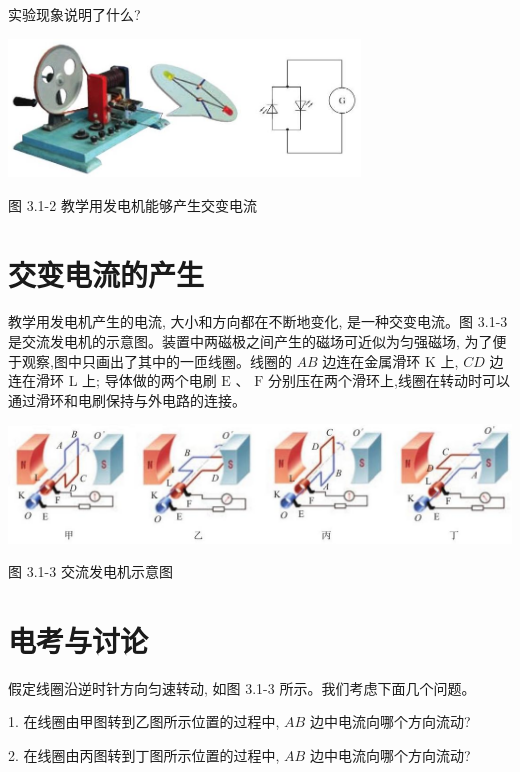 \documentclass[10pt]{article}
\begin{document}
实验现象说明了什么?

\begin{center}
\includegraphics[max width=0.7\textwidth]{images/01910e72-c5b7-7ed5-a6d4-fb3a5faefc32_55_591380.jpg}
\end{center}

图 3.1-2 教学用发电机能够产生交变电流

\section*{交变电流的产生}

教学用发电机产生的电流, 大小和方向都在不断地变化, 是一种交变电流。图 3.1-3 是交流发电机的示意图。装置中两磁极之间产生的磁场可近似为匀强磁场, 为了便于观察,图中只画出了其中的一匝线圈。线圈的 \({AB}\) 边连在金属滑环 \(\mathrm{K}\) 上, \({CD}\) 边连在滑环 \(\mathrm{L}\) 上; 导体做的两个电刷 \(\mathrm{E}\) 、 \(\mathrm{F}\) 分别压在两个滑环上,线圈在转动时可以通过滑环和电刷保持与外电路的连接。

\begin{center}
\includegraphics[max width=1.0\textwidth]{images/01910e72-c5b7-7ed5-a6d4-fb3a5faefc32_56_688658.jpg}
\end{center}

图 3.1-3 交流发电机示意图

\section*{电考与讨论}

假定线圈沿逆时针方向匀速转动, 如图 3.1-3 所示。我们考虑下面几个问题。

1. 在线圈由甲图转到乙图所示位置的过程中, \({AB}\) 边中电流向哪个方向流动?

2. 在线圈由丙图转到丁图所示位置的过程中, \({AB}\) 边中电流向哪个方向流动?
\end{document}
